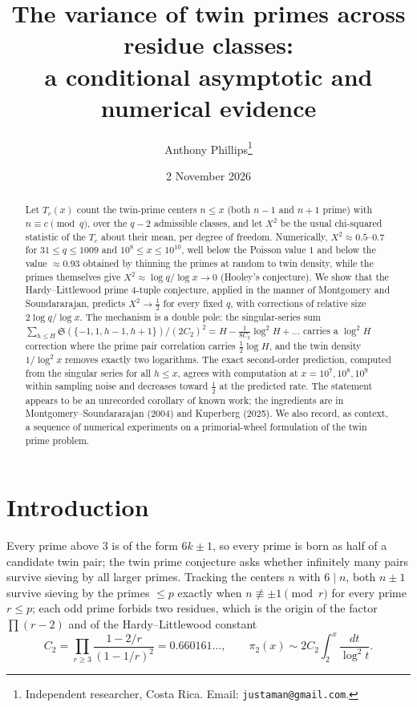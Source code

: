 \documentclass[11pt]{article}
\title{The variance of twin primes across residue classes:\\ a conditional asymptotic and numerical evidence}
\author{Anthony Phillips\thanks{Independent researcher, Costa Rica. Email: \texttt{justaman@gmail.com}.}}
\date{2 November 2026}
\newcommand{\sing}{\mathfrak{S}}
\begin{document}
\maketitle

\begin{abstract}
Let $T_c(x)$ count the twin-prime centers $n\le x$ (both $n-1$ and $n+1$ prime) with $n\equiv c \pmod q$, over the $q-2$ admissible classes, and let $X^2$ be the usual chi-squared statistic of the $T_c$ about their mean, per degree of freedom. Numerically, $X^2\approx 0.5$--$0.7$ for $31\le q\le 1009$ and $10^8\le x\le 10^{10}$, well below the Poisson value $1$ and below the value $\approx 0.93$ obtained by thinning the primes at random to twin density, while the primes themselves give $X^2\approx \log q/\log x\to 0$ (Hooley's conjecture). We show that the Hardy--Littlewood prime $4$-tuple conjecture, applied in the manner of Montgomery and Soundararajan, predicts $X^2\to \tfrac12$ for every fixed $q$, with corrections of relative size $2\log q/\log x$. The mechanism is a double pole: the singular-series sum $\sum_{h\le H}\sing(\{-1,1,h-1,h+1\})/(2C_2)^2 = H - \tfrac{1}{8C_2}\log^2 H + \dots$ carries a $\log^2 H$ correction where the prime pair correlation carries $\tfrac12\log H$, and the twin density $1/\log^2 x$ removes exactly two logarithms. The exact second-order prediction, computed from the singular series for all $h\le x$, agrees with computation at $x=10^7,10^8,10^9$ within sampling noise and decreases toward $\tfrac12$ at the predicted rate. The statement appears to be an unrecorded corollary of known work; the ingredients are in Montgomery--Soundararajan (2004) and Kuperberg (2025). We also record, as context, a sequence of numerical experiments on a primorial-wheel formulation of the twin prime problem.
\end{abstract}

\section{Introduction}

Every prime above $3$ is of the form $6k\pm 1$, so every prime is born as half of a candidate twin pair; the twin prime conjecture asks whether infinitely many pairs survive sieving by all larger primes. Tracking the centers $n$ with $6\mid n$, both $n\pm1$ survive sieving by the primes $\le p$ exactly when $n\not\equiv\pm1 \pmod r$ for every prime $r\le p$; each odd prime forbids two residues, which is the origin of the factor $\prod(r-2)$ and of the Hardy--Littlewood constant
\[
C_2=\prod_{r\ge3}\frac{1-2/r}{(1-1/r)^2}=0.660161\ldots,\qquad \pi_2(x)\sim 2C_2\int_2^x\frac{dt}{\log^2 t}.
\]
\end{document}
